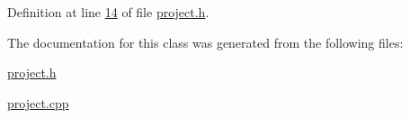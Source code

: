 Definition at line \hyperlink{project_8h_source_l00014}{14} of file \hyperlink{project_8h_source}{project.\+h}.



The documentation for this class was generated from the following files\+:\begin{DoxyCompactItemize}
\item 
\hyperlink{project_8h}{project.\+h}\item 
\hyperlink{project_8cpp}{project.\+cpp}\end{DoxyCompactItemize}
